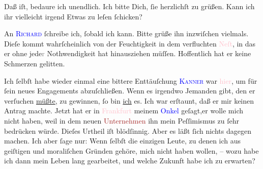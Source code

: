 \pstart
           Daß \label{K_L03195-23v}\label{K_L03195-23h} iſt, bedaure ich unendlich. Ich bitte Dich, ſie herzlichſt zu grüßen. Kann
               ich ihr vielleicht irgend Etwas zu leſen ſchicken?\pend
           
\pstart
           {\pb}An \textsc{\textcolor{blue}{Richard}{}\ledrightnote{\textcolor{blue}{Richard Beer-Hofmann}}} ſchreibe ich, ſobald ich kann. Bitte grüße ihn inzwiſchen vielmals. Dieſe
                  \label{K_L03195-44v}\label{K_L03195-44h} kommt wahrſcheinlich von der Feuchtigkeit in dem verfluchten \textcolor{pink}{Neſt}{}\ledrightnote{{$\rightarrow$}\textcolor{pink}{Rodaun}}, in das er ohne jede\textcolor{gray}{r}
               Nothwendigkeit hat hinausziehen müſſen. Hoffentlich hat er keine Schmerzen
               gelitten.\pend
           
\pstart
           Ich ſelbſt habe wieder einmal eine bittere Enttäuſchung \label{K_L03195-334v}\label{K_L03195-334h}{ }\textsc{\textcolor{blue}{Kanner}{}\ledrightnote{\textcolor{blue}{Heinrich Kanner}}} war \textcolor{pink}{hier}{}\ledrightnote{{$\rightarrow$}\textcolor{pink}{Berlin}}, um für ſein
               neues \label{K_L03195-2121v}\label{K_L03195-2121h} Engagements  abzuſchließen. Wenn es
               irgendwo Jemanden gibt, den er verſuchen \uline{müßte}, zu
               gewinnen, ſo bin \uline{ich} es. Ich war erſtaunt, daß er mir
               keinen Antrag machte. Jetzt hat er in {\pb}\textcolor{pink}{Frankfurt}{}\ledrightnote{\textcolor{pink}{Frankfurt am Main}} meinem \textcolor{blue}{Onkel}{}\ledrightnote{{$\rightarrow$}\textcolor{blue}{Fedor Mamroth}} geſagt,er wolle mich nicht haben, weil
               in dem neuen \textcolor{brown}{Unternehmen}{}\ledrightnote{{$\rightarrow$}\textcolor{brown}{Die Zeit}} ihn
               mein Peſſimismus zu ſehr bedrücken würde.  Dieſes
               Urtheil iſt blödſinnig. Aber es läßt ſich nichts dagegen machen. Ich aber ſage nur:
               Wenn ſelbſt die einzigen Leute,  zu
               denen ich aus geiſtigen und moraliſchen Gründen gehöre, mich nicht haben wollen, –
               wozu habe ich dann mein Leben lang gearbeitet, und welche Zukunft habe ich zu
               erwarten?\pend
           
